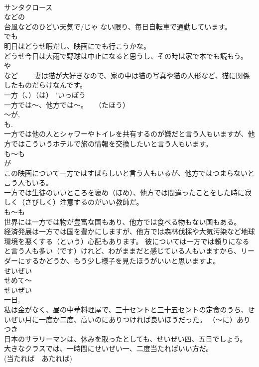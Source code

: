 \documentclass[8pt]{extreport}
\begin{document}
\begin{CJK}{UTF8}{min}
\\	サンタクロース 
\\	などの
\\	台風などのひどい天気で/じゃ ない限り、毎日自転車で通勤しています。 
\\	でも 
\\	明日はどうせ暇だし、映画にでも行こうかな。 
\\	どうせ今日は大雨で野球は中止になると思うし、その時は家で本でも読もう。 
\\	や
\\	など　　 妻は猫が大好きなので、家の中は猫の写真や猫の人形など、猫に関係したものだらけなんです。 
\\	一方（、）（は）	"いっぽう 
\\	一方では～、他方では～。　　（たほう） 
\\	～が, 
\\	も. 
\\	一方では他の人とシャワーやトイレを共有するのが嫌だと言う人もいますが、他方ではこういうホテルで旅の情報を交換したいと言う人もいます。 
\\	も～も 
\\	が 
\\	この映画について一方ではすばらしいと言う人もいるが、他方ではつまらないと言う人もいる。 
\\	一方では生徒のいいところを褒め（ほめ）、他方では間違ったことをした時に寂しく（さびしく）注意するのがいい教師だ。 
\\	も～も 
\\	世界には一方では物が豊富な国もあり、他方では食べる物もない国もある。 
\\	経済発展は一方では国を豊かにしますが、他方では森林伐採や大気汚染など地球環境を悪くする（という）心配もあります。 彼については一方では頼りになると言う人も多い（です）けれど、わがままだと感じている人もいますから、リーダーにするかどうか、もう少し様子を見たほうがいいと思いますよ。
\\	せいぜい	
\\	せめて～ 
\\	せいぜい
\\	一日, 
\\	私は金がなく、昼の中華料理屋で、三十セントと三十五セントの定食のうち、せいぜい月に一度か二度、高いのにありつければ良いほうだった。 （～に）ありつき　　
\\	日本のサラリーマンは、休みを取ったとしても、せいぜい四、五日でしょう。 
\\	大きなクラスでは、一時間にせいぜい一、二度当たればいい方だ。 
\\	(当たれば　あたれば) 

\end{CJK}
\end{document}
